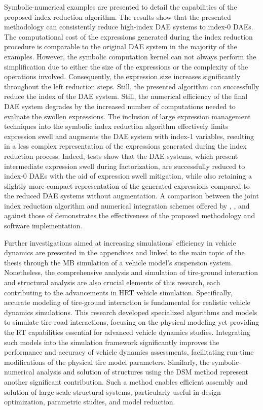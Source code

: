 Symbolic-numerical examples are presented to detail the capabilities of the proposed index reduction algorithm. The results show that the presented methodology can consistently reduce high-index \ac{DAE} systems to index-0 \acp{DAE}. The computational cost of the expressions generated during the index reduction procedure is comparable to the original \ac{DAE} system in the majority of the examples. However, the \Maple{} symbolic computation kernel can not always perform the simplification due to either the size of the expressions or the complexity of the operations involved. Consequently, the expression size increases significantly throughout the left reduction steps. Still, the presented algorithm can successfully reduce the index of the \ac{DAE} system. Still, the numerical efficiency of the final \ac{DAE} system degrades by the increased number of computations needed to evaluate the swollen expressions. The inclusion of large expression management techniques into the symbolic index reduction algorithm effectively limits expression swell and augments the \ac{DAE} system with index-1 variables, resulting in a less complex representation of the expressions generated during the index reduction process. Indeed, tests show that the \ac{DAE} systems, which present intermediate expression swell during factorization, are successfully reduced to index-0 \acp{DAE} with the aid of expression swell mitigation, while also retaining a slightly more compact representation of the generated expressions compared to the reduced \ac{DAE} systems without augmentation. A comparison between the joint index reduction algorithm and numerical integration schemes offered by \Maple{}, \Mathematica{}, and \Matlab{} against those of \Indigo{} demonstrates the effectiveness of the proposed methodology and software implementation.

Further investigations aimed at increasing simulations' efficiency in vehicle dynamics are presented in the appendices and linked to the main topic of the thesis through the \ac{MB} simulation of a vehicle model's suspension system. Nonetheless, the comprehensive analysis and simulation of tire-ground interaction and structural analysis are also crucial elements of this research, each contributing to the advancements in \ac{HRT} vehicle simulation. Specifically, accurate modeling of tire-ground interaction is fundamental for realistic vehicle dynamics simulations. This research developed specialized algorithms and models to simulate tire-road interactions, focusing on the physical modeling yet providing the \ac{RT} capabilities essential for advanced vehicle dynamics studies. Integrating such models into the simulation framework significantly improves the performance and accuracy of vehicle dynamics assessments, facilitating run-time modifications of the physical tire model parameters. Similarly, the symbolic-numerical analysis and solution of structures using the \ac{DSM} method represent another significant contribution. Such a method enables efficient assembly and solution of large-scale structural systems, particularly useful in design optimization, parametric studies, and model reduction.

